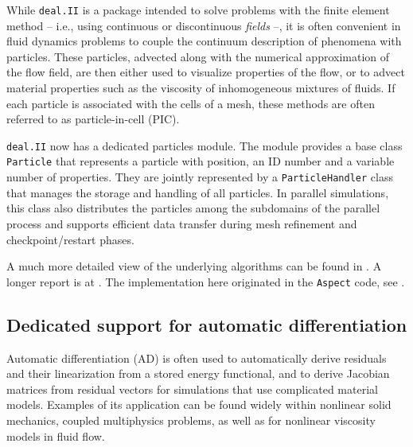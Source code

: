 \documentclass{ansarticle-preprint}
\newcommand{\specialword}[1]{\texttt{#1}}
\newcommand{\dealii}{{\specialword{deal.II}}\xspace}
\newcommand{\aspect}{\specialword{Aspect}\xspace}
\begin{document}
While \dealii is a package intended to solve problems with the
finite element method -- i.e., using continuous or discontinuous
\textit{fields} --, it is often convenient in fluid dynamics problems to
couple the continuum description of phenomena with particles. These
particles, advected along with the numerical approximation of the flow
field, are then either used to visualize properties of the flow, or to
advect material properties such as the viscosity of inhomogeneous
mixtures of fluids. If each particle is associated with the cells
of a mesh, these methods are often referred to as particle-in-cell (PIC).

\dealii now has a dedicated particles module. The module provides a base class
\texttt{Particle} that represents a particle with position, an ID number and
a variable number of properties. They are jointly represented by a \texttt{ParticleHandler}
class that manages the storage and handling of all particles. In
parallel simulations, this class also
distributes the particles among the subdomains of the parallel process
and supports efficient data transfer during mesh refinement and
checkpoint/restart phases.

A much more detailed view of the underlying algorithms can be found in
\cite{GLHPB18}. A longer report is at \cite{GHPB16}. The
implementation here originated in the \aspect code, see \cite{KHB12,HDGB17}.


\subsection{Dedicated support for automatic differentiation}

Automatic differentiation (AD) is often used to automatically derive
residuals and their linearization from a stored energy functional, and to
derive Jacobian matrices from residual vectors for simulations that use
complicated material models. Examples of its application can be found widely
within nonlinear solid mechanics, coupled multiphysics problems, as well as
for nonlinear viscosity models in fluid flow.
\end{document}
